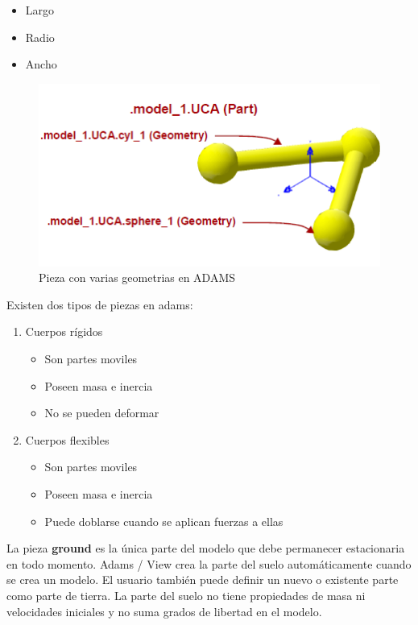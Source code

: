         \begin{itemize}
            \item Largo
            \item Radio
            \item Ancho
        \end{itemize}
        
        \begin{figure}[H]
            \centering
           \includegraphics[width=0.7\linewidth]{Main/Chapter3/Images3/papeo/pieza.png}
            \caption{Pieza con varias geometrias en ADAMS \cite{adams-basic}}
            \label{f:Cap3-adams_pieza}
        \end{figure} 
        
        
        Existen dos tipos de piezas en adams:
        
        \begin{enumerate}
            \item Cuerpos rígidos
                \begin{itemize}
                    \item Son partes moviles
                    \item Poseen masa e inercia
                    \item No se pueden deformar
                \end{itemize}
            \item Cuerpos flexibles
                \begin{itemize}
                    \item Son partes moviles
                    \item Poseen masa e inercia
                    \item Puede doblarse cuando se aplican fuerzas a ellas
                \end{itemize}
        \end{enumerate}
        
        La pieza \textbf{ground} es la única parte del modelo que debe permanecer estacionaria en todo momento.
        Adams / View crea la parte del suelo automáticamente cuando se crea un modelo. El usuario también puede definir un nuevo o existente parte como parte de tierra. La parte del suelo no tiene propiedades de masa ni velocidades iniciales y no suma grados de libertad en el modelo.
        
